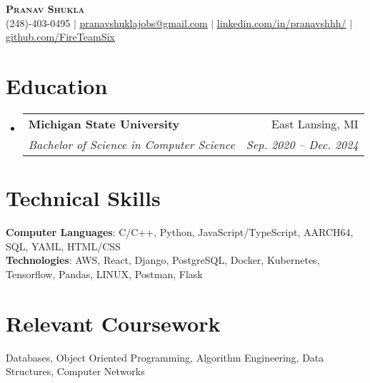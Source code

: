\documentclass[letterpaper,11pt]{article}
\makeatletter
\newcommand{\resumeSubheading}[4]{
  \vspace{-2pt}\item
    \begin{tabular*}{0.97\textwidth}[t]{l@{\extracolsep{\fill}}r}
      \textbf{#1} & #2 \\
      \textit{\small#3} & \textit{\small #4} \\
    \end{tabular*}\vspace{-7pt}
}
\newcommand{\resumeSubHeadingListStart}{\begin{itemize}[leftmargin=0.15in, label={}]}
\newcommand{\resumeSubHeadingListEnd}{\end{itemize}}
\makeatother
\begin{document}

\begin{center}
    \textbf{\Huge \scshape Pranav Shukla} \\ \vspace{1pt}
    \small (248)-403-0495 $|$ \href{mailto:pranavshuklajobs@gmail.com}{\underline{pranavshuklajobs@gmail.com}} $|$ 
    \href{https://www.linkedin.com/in/pranavshhh/}{\underline{linkedin.com/in/pranavshhh/}} $|$
    \href{https://github.com/FireTeamSix}{\underline{github.com/FireTeamSix}}
\end{center}


\section{Education}
  \resumeSubHeadingListStart
    \resumeSubheading
      {Michigan State University}{East Lansing, MI}
      {Bachelor of Science in Computer Science}{Sep. 2020 -- Dec. 2024}
  \resumeSubHeadingListEnd

\section{Technical Skills}
 \begin{itemize}[leftmargin=0.15in, label={}]
    \small{\item{
     \textbf{Computer Languages}{: C/C++, Python, JavaScript/TypeScript, AARCH64, SQL, YAML, HTML/CSS} \\
     \textbf{Technologies}{: AWS, React, Django, PostgreSQL, Docker, Kubernetes, Tensorflow, Pandas, LINUX, Postman, Flask} \\
    }}
 \end{itemize}

\section{Relevant Coursework}
  \begin{itemize}[leftmargin=0.15in, label={}]
    \small{\item{
     {Databases, Object Oriented Programming, Algorithm Engineering, Data Structures, Computer Networks} \\
    }}
  \end{itemize}
\end{document}
